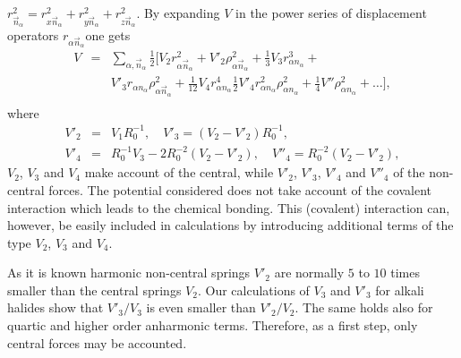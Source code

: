 ${r}_{\vec{n}_{\alpha}}^{2} = {r}^{2}_{x\vec{n}_{\alpha}} + 
{r}^{2}_{y\vec{n}_{\alpha}} + {r}^{2}_{z \vec{n}_{\alpha}}$. 
By expanding ${V}$ in the power series of displacement operators  
${r}_{\alpha\vec{n}_{\alpha}}$one gets 
\begin{eqnarray}  
V & = & \sum_{\alpha ,\vec{n}_{\alpha}}
\frac{1}{2}  
[V_2 r^2_{\alpha \vec{n}_{\alpha}} +  
V'_2 \rho^2_{\alpha \vec{n}_{\alpha}}  + 
\frac{1}{3} V_3{r}^3_{\alpha n_{\alpha}} + \nonumber\\ 
 & & 
V'_3 r_{\alpha n_{\alpha}} 
\rho^2_{\alpha\vec{n}_{\alpha}}+ 
\frac{1}{12} V_4 r^4_{\alpha n_{\alpha}}  
\frac{1}{2} V'_4 r^2_{\alpha n_{\alpha}}{\rho}^2_{\alpha n_{\alpha}} +
\frac{1}{4} V'' \rho^2_{{\alpha n_{\alpha}}} + \ldots],
\nonumber \\ 
\end{eqnarray} 
where 
\begin{eqnarray} 
V'_2 &=& V_1 R_0^{-1},\quad V'_3 = (V_2 - V'_2)R_0^{-1}, \nonumber \\ 
V'_4 &=& R_0^{-1}V_3 - 2R_0^{-2}(V_2 - V'_2),\quad 
V''_4 = R_0^{-2} (V_2 - V'_2), 
\end{eqnarray} 
$V_{2}$, $V_{3}$ and $V_{4}$ make account of the central, while $V'_{2}$, 
$V'_{3}$, $V'_{4}$ and $V''_{4}$ of the non-central forces. The potential 
considered does not take account of the covalent interaction which leads to 
the chemical bonding. This (covalent) interaction can, however, be easily 
included in calculations by introducing additional terms of the type $V_{2}$, 
$V_{3}$ and $V_{4}$. 

As it is known harmonic non-central springs $V'_2$ are normally $5$ to $10$ 
times smaller than the central springs $V_2$. Our calculations of $V_3$ and 
$V'_3$ for alkali halides show that $V'_3/V_3$ is even smaller than 
$V'_2/V_2$. The same holds also for quartic and higher order anharmonic terms.
Therefore, as a first step, only central forces may 
be accounted. 

